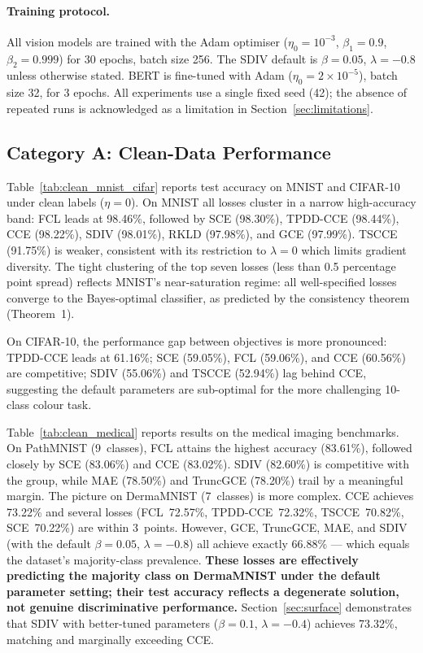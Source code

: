 \paragraph{Training protocol.}
All vision models are trained with the Adam optimiser ($\eta_0{=}10^{-3}$,
$\beta_1{=}0.9$, $\beta_2{=}0.999$) for 30 epochs, batch size 256.
The SDIV default is $\beta{=}0.05$, $\lambda{=}{-0.8}$ unless otherwise
stated.
BERT is fine-tuned with Adam ($\eta_0{=}2{\times}10^{-5}$), batch size 32,
for 3 epochs.
All experiments use a single fixed seed (42); the absence of repeated runs
is acknowledged as a limitation in Section~\ref{sec:limitations}.

\subsection{Category A: Clean-Data Performance}
\label{sec:clean}

Table~\ref{tab:clean_mnist_cifar} reports test accuracy on MNIST and CIFAR-10
under clean labels ($\eta{=}0$).
On MNIST all losses cluster in a narrow high-accuracy band:
FCL leads at 98.46\%, followed by SCE (98.30\%), TPDD-CCE (98.44\%),
CCE (98.22\%), SDIV (98.01\%), RKLD (97.98\%), and GCE (97.99\%).
TSCCE (91.75\%) is weaker, consistent with its restriction to $\lambda{=}0$
which limits gradient diversity.
The tight clustering of the top seven losses (less than 0.5 percentage point spread) reflects
MNIST's near-saturation regime: all well-specified losses converge to the
Bayes-optimal classifier, as predicted by the consistency theorem
(Theorem~1).

On CIFAR-10, the performance gap between objectives is more pronounced:
TPDD-CCE leads at 61.16\%; SCE (59.05\%), FCL (59.06\%), and CCE (60.56\%)
are competitive; SDIV (55.06\%) and TSCCE (52.94\%) lag behind
CCE, suggesting the default parameters are sub-optimal for the more
challenging 10-class colour task.

Table~\ref{tab:clean_medical} reports results on the medical imaging benchmarks.
On PathMNIST (9~classes), FCL attains the highest accuracy (83.61\%),
followed closely by SCE (83.06\%) and CCE (83.02\%).
SDIV (82.60\%) is competitive with the group, while MAE (78.50\%) and
TruncGCE (78.20\%) trail by a meaningful margin.
The picture on DermaMNIST (7~classes) is more complex.
CCE achieves 73.22\% and several losses
(FCL~72.57\%, TPDD-CCE~72.32\%, TSCCE~70.82\%, SCE~70.22\%)
are within 3~points.
However, GCE, TruncGCE, MAE, and SDIV (with the default $\beta{=}0.05$,
$\lambda{=}{-0.8}$) all achieve exactly 66.88\% --- which equals the
dataset's majority-class prevalence.
\textbf{These losses are effectively predicting the majority class on
DermaMNIST under the default parameter setting; their test accuracy reflects
a degenerate solution, not genuine discriminative performance.}
Section~\ref{sec:surface} demonstrates that SDIV with better-tuned parameters
($\beta{=}0.1$, $\lambda{=}{-0.4}$) achieves 73.32\%, matching and
marginally exceeding CCE.

